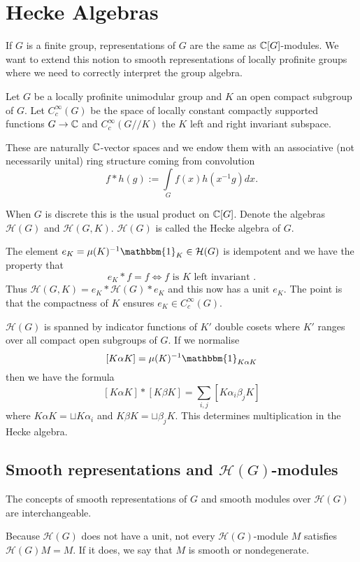 \section{Hecke Algebras}

If $G$ is a finite group, representations of $G$ are the same as $\mathbb{C}[G]$-modules. We want to extend this notion to smooth representations of locally profinite groups where we need to correctly interpret the group algebra.

Let $G$ be a locally profinite unimodular group and $K$ an open compact subgroup of $G$. Let $C_c^\infty(G)$ be the space of locally constant compactly supported functions $G \to \mathbb{C}$ and $C_c^\infty(G//K)$ the $K$ left and right invariant subspace.

These are naturally $\mathbb{C}$-vector spaces and we endow them with an associative (not necessarily unital) ring structure coming from convolution
$$f * h(g) := \int\limits_G f(x)h(x^{-1}g)dx.$$

When $G$ is discrete this is the usual product on $\mathbb{C}[G]$. Denote the algebras $\mathcal H(G)$ and $\mathcal H(G,K)$. $\mathcal H(G)$ is called the Hecke algebra of $G$.

The element $e_K = \mu(K)^{-1} \mathbbm{1}_K \in \mathcal H(G)$ is idempotent and we have the property that 
$$e_K * f = f \Leftrightarrow f \text{ is $K$ left invariant }.$$
Thus $\mathcal H(G,K) = e_K * \mathcal H(G) * e_K$ and this now has a unit $e_K$. The point is that the compactness of $K$ ensures $e_K \in C_c^\infty(G)$.

$\mathcal H(G)$ is spanned by indicator functions of $K'$ double cosets where $K'$ ranges over all compact open subgroups of $G$. If we normalise $$[K\alpha K] = \mu(K)^{-1} \mathbbm{1}_{K\alpha K}$$ then we have the formula
$$[K\alpha K] * [K\beta K] = \sum\limits_{i,j}[K\alpha_i \beta_j K]$$ where $K\alpha K = \sqcup K\alpha_i$ and $K\beta K = \sqcup \beta_j K$. This determines multiplication in the Hecke algebra.

\subsection{Smooth representations and $\mathcal H(G)$-modules}
The concepts of smooth representations of $G$ and smooth modules over $\mathcal H(G)$ are interchangeable.

Because $\mathcal H(G)$ does not have a unit, not every $\mathcal H(G)$-module $M$ satisfies $\mathcal H(G) M = M$. If it does, we say that $M$ is smooth or nondegenerate.

